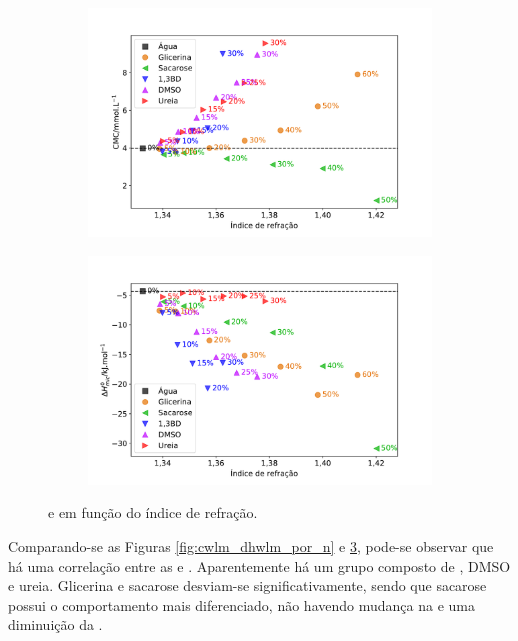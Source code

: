 		\begin{figure}[h]
			\begin{subfigure}[t]{0.5\textwidth}
				\centering
				\includegraphics[width=\textwidth]{imagens/itc/CMC_por_n}
				\caption{\cmc}
				\label{fig:cmc_por_n}
			\end{subfigure} %
			\begin{subfigure}[t]{0.5\textwidth}
				\centering
				\includegraphics[width=\textwidth]{imagens/itc/DH_por_n}
				\caption{\DHmic}
				\label{fig:dh_por_n}
			\end{subfigure}
			
			\caption{\cmc{} e \DHmic{} em função do índice de refração.}
			\label{fig:cmc_dh_por_n}
		\end{figure}

		Comparando-se as Figuras \ref{fig:cwlm_dhwlm_por_n} e \ref{fig:cmc_dh_por_n}, pode-se observar que há uma correlação entre as \cmc{} e \cwlm. Aparentemente há um grupo composto de \BD, DMSO e ureia. Glicerina e sacarose desviam-se significativamente, sendo que sacarose possui o comportamento mais diferenciado, não havendo mudança na \cwlm{} e uma diminuição da \cmc{}.
		
